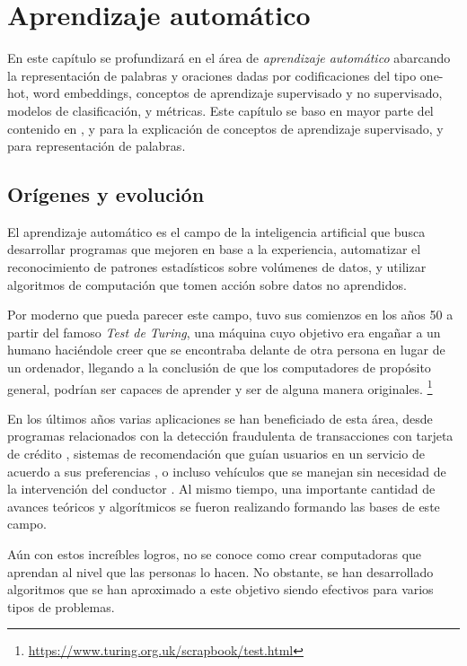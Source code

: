 \chapter{Aprendizaje automático}
\label{ch:lit_ml}

En este capítulo se profundizará en el área de \emph{aprendizaje automático}
abarcando la representación de palabras y oraciones dadas por codificaciones del
tipo one-hot, word embeddings, conceptos de aprendizaje supervisado y no
supervisado, modelos de clasificación, y métricas. Este capítulo se baso en
mayor parte del contenido en \citep{Bishop-2006}, y \citep{Tianqi-2016} para la
explicación de conceptos de aprendizaje supervisado, y
\citep{Bojanowski-Grave-Joulin-Mikolov-2016, bojanowski-2017, Mikolov-2013} para
representación de palabras.

\section{Orígenes y evolución}

El aprendizaje automático es el campo de la inteligencia artificial que busca
desarrollar programas que mejoren en base a la experiencia, automatizar el
reconocimiento de patrones estadísticos sobre volúmenes de datos, y utilizar
algoritmos de computación que tomen acción sobre datos no aprendidos.

Por moderno que pueda parecer este campo, tuvo sus comienzos en los años 50 a
partir del famoso \emph{Test de Turing}, una máquina cuyo objetivo era engañar a
un humano haciéndole creer que se encontraba delante de otra persona en lugar de
un ordenador, llegando  a la conclusión de que los computadores de propósito
general, podrían ser capaces de aprender y ser de alguna manera originales.
\footnote{\url{https://www.turing.org.uk/scrapbook/test.html}}

En los últimos años varias aplicaciones se han beneficiado de esta área, desde
programas relacionados con la detección fraudulenta de transacciones con tarjeta
de crédito \citep{Fang-2021}, sistemas de recomendación que guían usuarios en un
servicio de acuerdo a sus preferencias \citep{Burke-2007}, o incluso vehículos
que se manejan sin necesidad de la intervención del conductor
\citep{Sorin-2019}. Al mismo tiempo, una importante cantidad de avances teóricos
y algorítmicos se fueron realizando formando las bases de este campo.

Aún con estos increíbles logros, no se conoce como crear computadoras que
aprendan al nivel que las personas lo hacen. No obstante, se han desarrollado
algoritmos que se han aproximado a este objetivo siendo efectivos para varios
tipos de problemas.

